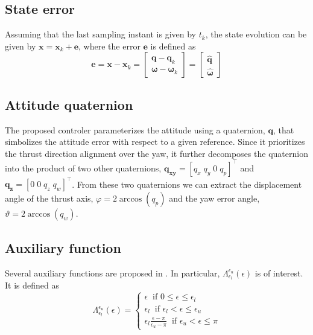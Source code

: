 \documentclass{article}
\begin{document}
		\subsection{State error}
			Assuming that the last sampling instant is given by $t_k$, the state evolution can be given by $\mathbf{x} = \mathbf{x}_k + \mathbf{e}$, where the error $\mathbf{e}$ is defined as
			\begin{equation}
				\mathbf{e} = \mathbf{x} - \mathbf{x}_k = \begin{bmatrix}
											\mathbf{q} - \mathbf{q}_k\\
											\boldsymbol \omega - \boldsymbol \omega_k
										  \end{bmatrix} =			
										 \begin{bmatrix}
											 \mathbf{\hat{q}} \\
											  \hat{\boldsymbol \omega}
										  \end{bmatrix}
				\label{error}
			\end{equation}
		
		\subsection{Attitude quaternion}
			The proposed controler parameterizes the attitude using a quaternion, $\mathbf{q}$, that simbolizes the attitude error with respect to a given reference. Since it prioritizes the thrust direction alignment over the yaw, it further decomposes the quaternion into the product of two other quaternions, $\mathbf{q_{xy}} = \left [q_x \; q_y \; 0 \; q_p \right]^\top$  and $\mathbf{q_{z}} = \left[0\;0\;q_z\;q_w \right]^\top$. From these two quaternions we can extract the displacement angle of the thrust axis, $\varphi = 2 \arccos(q_p)$ and the yaw error angle, $\vartheta = 2 \arccos(q_w)$. 
		
		\subsection{Auxiliary function}
			Several auxiliary functions are proposed in \cite{lohmann_attitude}. In particular, $\Lambda_{\epsilon_l}^{\epsilon_u}(\epsilon)$ is of interest. It is defined as
			\begin{equation}
				\Lambda_{\epsilon_l}^{\epsilon_u}(\epsilon) = \left \{ \begin{array}{l}
												\epsilon\;\; \text{if } 0 \leq \epsilon \leq \epsilon_l\\
												\epsilon_l\;\; \text{if } \epsilon_l < \epsilon \leq \epsilon_u\\
												\epsilon_l \frac{\epsilon - \pi}{\epsilon_u - \pi}\;\; \text{if } \epsilon_u < \epsilon \leq \pi
											\end{array} \right .
				\label{lambda}
			\end{equation}
\end{document}
